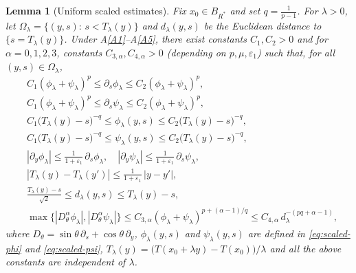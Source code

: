 \documentclass[
  sn-mathphys-num,
  colorlinks,
  linkcolor=darkmagenta,
  citecolor=rufous,
  urlcolor=zaffre,
  hypertexnames=false
]{sn-jnl}
\numberwithin{equation}{section}
\newtheorem{lemma}[theorem]{Lemma}%
\begin{document}
\begin{lemma}[Uniform scaled estimates]\label{lem:scaled-estimates}
Fix $x_0\in B_{R^*}$ and set $q=\tfrac1{p-1}$. For $\lambda>0$, let $\Omega_\lambda=\{(y,s):\,s<T_\lambda(y)\}$ and $d_\lambda(y,s)$ be the Euclidean distance to $\{s=T_\lambda(y)\}$. Under \textup{A\ref{A1}}–\textup{A\ref{A5}}, there exist constants $C_1, C_2>0$ and for $\alpha=0,1,2,3$, constants $C_{3,\alpha},C_{4,\alpha}>0$ (depending on $p,\mu,\varepsilon_1$) such that, for all $(y,s)\in\Omega_\lambda$,
\begin{align}
&C_1(\phi_\lambda+\psi_\lambda)^p \le \partial_s\phi_\lambda \le C_2(\phi_\lambda+\psi_\lambda)^p, \label{4.14}\\
&C_1(\phi_\lambda+\psi_\lambda)^p \le \partial_s\psi_\lambda \le C_2(\phi_\lambda+\psi_\lambda)^p, \\
&C_1\bigl(T_\lambda(y)-s\bigr)^{-q} \le \phi_\lambda(y,s) \le C_2\bigl(T_\lambda(y)-s\bigr)^{-q}, \\
&C_1\bigl(T_\lambda(y)-s\bigr)^{-q} \le \psi_\lambda(y,s) \le C_2\bigl(T_\lambda(y)-s\bigr)^{-q}, \\
&|\partial_y\phi_\lambda| \le \frac{1}{1+\varepsilon_1}\,\partial_s\phi_\lambda,\quad
 |\partial_y\psi_\lambda| \le \frac{1}{1+\varepsilon_1}\,\partial_s\psi_\lambda, \\
&|T_\lambda(y)-T_\lambda(y')| \le \frac{1}{1+\varepsilon_1}\,|y-y'|, \label{20} \\
&\frac{T_\lambda(y)-s}{\sqrt{2}} \le d_\lambda(y,s) \le T_\lambda(y)-s, \\
&\max\{|D_\theta^{\alpha}\phi_\lambda|, |D_\theta^{\alpha}\psi_\lambda|\}
   \le C_{3,\alpha} (\phi_\lambda+\psi_\lambda)^{p+(\alpha-1)/q}
   \le C_{4,\alpha}\,d_\lambda^{-(pq+\alpha-1)}, \label{5.23}
\end{align}
where $D_\theta=\sin\theta\,\partial_s+\cos\theta\,\partial_y$, $\phi_\lambda(y,s)$ and $\psi_\lambda(y,s)$ are defined in \eqref{eq:scaled-phi} and \eqref{eq:scaled-psi}, $T_\lambda(y)=\big(T(x_0+\lambda y)-T(x_0)\big)/\lambda$  and all the above constants are independent of $\lambda$.
\end{lemma}
\end{document}
